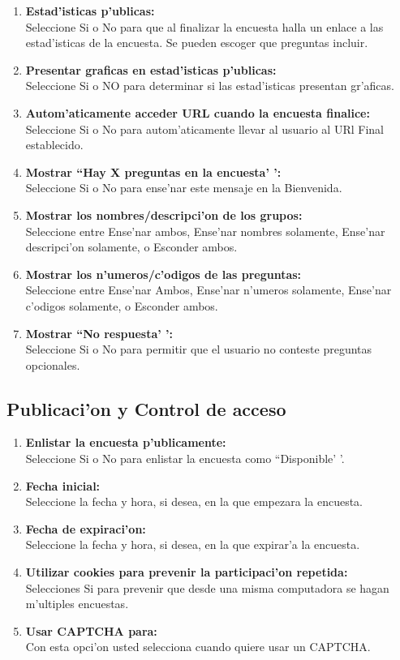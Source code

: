 \documentclass[12pt,spanish]{report}
\begin{document}
\begin{enumerate}
	\item {\bf Estad'isticas p'ublicas: } \\ Seleccione Si o No para que al finalizar la encuesta halla un enlace a las estad'isticas de la encuesta. Se pueden escoger que preguntas incluir.
	\item {\bf Presentar graficas en estad'isticas p'ublicas: } \\ Seleccione Si o NO para determinar si las estad'isticas presentan gr'aficas.
	\item {\bf Autom'aticamente acceder URL cuando la encuesta finalice: } \\ Seleccione Si o No para autom'aticamente llevar al usuario al URl Final establecido.
	\item {\bf Mostrar ``Hay X preguntas en la encuesta' ': } \\ Seleccione Si o No para ense'nar este mensaje en la Bienvenida.
	\item {\bf Mostrar los nombres/descripci'on de los grupos: } \\ Seleccione entre Ense'nar ambos, Ense'nar nombres solamente, Ense'nar descripci'on solamente, o Esconder ambos.
	\item {\bf Mostrar los n'umeros/c'odigos de las preguntas: } \\ Seleccione entre Ense'nar Ambos, Ense'nar n'umeros solamente, Ense'nar c'odigos solamente, o Esconder ambos.
	\item {\bf Mostrar ``No respuesta' ': } \\ Seleccione Si o No para permitir que el usuario no conteste preguntas opcionales.
\end{enumerate}

\subsection {Publicaci'on y Control de acceso}

	\begin {enumerate}
		\item {\bf Enlistar la encuesta p'ublicamente:}\\
			 Seleccione Si o No para enlistar la encuesta como ``Disponible' '.
		\item {\bf Fecha inicial:}\\
			 Seleccione la fecha y hora, si desea, en la que empezara la encuesta.
		\item {\bf Fecha de expiraci'on:}\\
			 Seleccione la fecha y hora, si desea, en la que expirar'a la encuesta.
		\item {\bf Utilizar cookies para prevenir la participaci'on repetida:}\\
			 Selecciones Si para prevenir que desde una misma computadora se hagan m'ultiples encuestas.
		\item {\bf Usar CAPTCHA para:}\\
			 Con esta opci'on usted selecciona cuando quiere usar un CAPTCHA.
	\end{enumerate}
\end{document}
